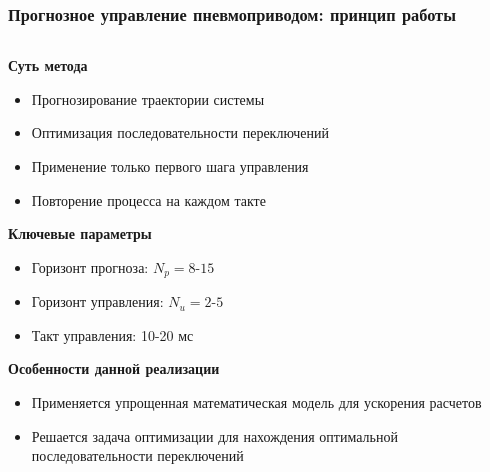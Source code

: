 \begin{frame}
	\frametitle{Прогнозное управление пневмоприводом: принцип работы}

	\begin{columns}[T]
		\begin{column}{0.48\textwidth}
			\vspace{-1.5em}
			\begin{block}{\small\textbf{Суть метода}}
				\scriptsize
				\begin{itemize}\setlength{\itemsep}{0pt}
					\item Прогнозирование траектории системы
					\item Оптимизация последовательности переключений
					\item Применение только первого шага управления
					\item Повторение процесса на каждом такте
				\end{itemize}
			\end{block}


			\vspace{-0.6em}
			\begin{exampleblock}{\small \textbf{Ключевые параметры}}
				\scriptsize
				\begin{itemize}\setlength{\itemsep}{0pt}
					\item Горизонт прогноза: $N_p = 8$-$15$
					\item Горизонт управления: $N_u = 2$-$5$
					\item Такт управления: 10-20 мс
				\end{itemize}
			\end{exampleblock}

			\vspace{-0.6em}
			\begin{alertblock}{\small \textbf{Особенности данной реализации}}
				\begin{itemize}
					\item \scriptsize Применяется упрощенная математическая модель для ускорения расчетов
					\item \scriptsize Решается задача оптимизации для нахождения оптимальной последовательности переключений
				\end{itemize}
			\end{alertblock}


\end{column}
\end{columns}
\end{frame}
